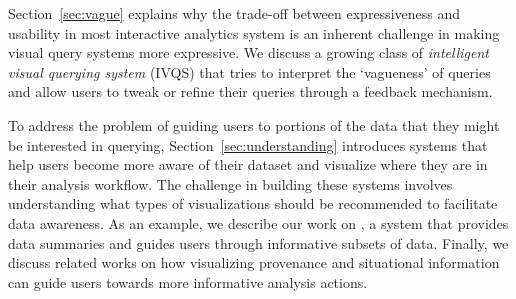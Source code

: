 \par Section~\ref{sec:vague} explains why the trade-off between expressiveness and usability in most interactive analytics system is an inherent challenge in making visual query systems more expressive. We discuss a growing class of \textit{intelligent visual querying system} (IVQS) that tries to interpret the `vagueness' of queries and allow users to tweak or refine their queries through a feedback mechanism.
\par To address the problem of guiding users to portions of the data that they might be interested in querying, Section~\ref{sec:understanding} introduces systems that help users become more aware of their dataset and visualize where they are in their analysis workflow. The challenge in building these systems involves understanding what types of visualizations should be recommended to facilitate data awareness. As an example, we describe our work on \sbd, a system that provides data summaries and guides users through informative subsets of data. Finally, we discuss related works on how visualizing provenance and situational information can guide users towards more informative analysis actions.
